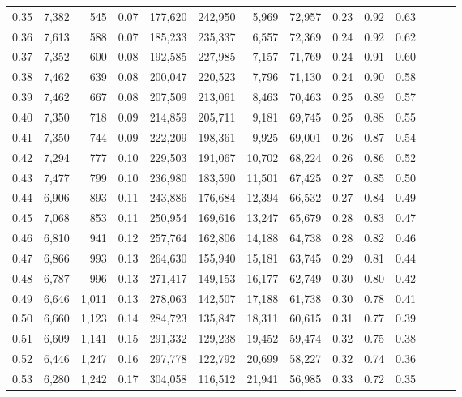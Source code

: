 \begin{tabular}{rrrrrrrrrrrrrr}
0.35 &  7,382 &    545 &  0.07 &  177,620 &  242,950 &   5,969 &  72,957 &  0.23 &  0.92 &      0.63 \\
0.36 &  7,613 &    588 &  0.07 &  185,233 &  235,337 &   6,557 &  72,369 &  0.24 &  0.92 &      0.62 \\
0.37 &  7,352 &    600 &  0.08 &  192,585 &  227,985 &   7,157 &  71,769 &  0.24 &  0.91 &      0.60 \\
0.38 &  7,462 &    639 &  0.08 &  200,047 &  220,523 &   7,796 &  71,130 &  0.24 &  0.90 &      0.58 \\
0.39 &  7,462 &    667 &  0.08 &  207,509 &  213,061 &   8,463 &  70,463 &  0.25 &  0.89 &      0.57 \\
0.40 &  7,350 &    718 &  0.09 &  214,859 &  205,711 &   9,181 &  69,745 &  0.25 &  0.88 &      0.55 \\
0.41 &  7,350 &    744 &  0.09 &  222,209 &  198,361 &   9,925 &  69,001 &  0.26 &  0.87 &      0.54 \\
0.42 &  7,294 &    777 &  0.10 &  229,503 &  191,067 &  10,702 &  68,224 &  0.26 &  0.86 &      0.52 \\
0.43 &  7,477 &    799 &  0.10 &  236,980 &  183,590 &  11,501 &  67,425 &  0.27 &  0.85 &      0.50 \\
0.44 &  6,906 &    893 &  0.11 &  243,886 &  176,684 &  12,394 &  66,532 &  0.27 &  0.84 &      0.49 \\
0.45 &  7,068 &    853 &  0.11 &  250,954 &  169,616 &  13,247 &  65,679 &  0.28 &  0.83 &      0.47 \\
0.46 &  6,810 &    941 &  0.12 &  257,764 &  162,806 &  14,188 &  64,738 &  0.28 &  0.82 &      0.46 \\
0.47 &  6,866 &    993 &  0.13 &  264,630 &  155,940 &  15,181 &  63,745 &  0.29 &  0.81 &      0.44 \\
0.48 &  6,787 &    996 &  0.13 &  271,417 &  149,153 &  16,177 &  62,749 &  0.30 &  0.80 &      0.42 \\
0.49 &  6,646 &  1,011 &  0.13 &  278,063 &  142,507 &  17,188 &  61,738 &  0.30 &  0.78 &      0.41 \\
0.50 &  6,660 &  1,123 &  0.14 &  284,723 &  135,847 &  18,311 &  60,615 &  0.31 &  0.77 &      0.39 \\
0.51 &  6,609 &  1,141 &  0.15 &  291,332 &  129,238 &  19,452 &  59,474 &  0.32 &  0.75 &      0.38 \\
0.52 &  6,446 &  1,247 &  0.16 &  297,778 &  122,792 &  20,699 &  58,227 &  0.32 &  0.74 &      0.36 \\
0.53 &  6,280 &  1,242 &  0.17 &  304,058 &  116,512 &  21,941 &  56,985 &  0.33 &  0.72 &      0.35 \\

\end{tabular}
